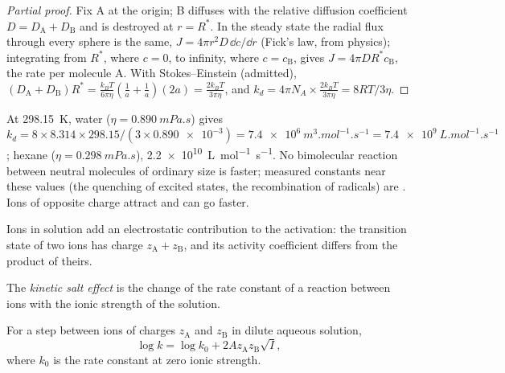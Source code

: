 \begin{proof}[Partial proof]
Fix A at the origin; B diffuses with the relative diffusion coefficient $D =
D_{\mathrm A} + D_{\mathrm B}$ and is destroyed at $r = R^*$. In the steady state the radial flux
through every sphere is the same, $J = 4\pi r^2D\,\dd c/\dd r$ (Fick's law, from
physics); integrating from $R^*$, where $c = 0$, to infinity, where $c = c_{\mathrm B}$, gives
$J = 4\pi DR^*c_{\mathrm B}$, the rate per molecule A. With Stokes--Einstein (admitted),
$(D_{\mathrm A} + D_{\mathrm B})R^* = \frac{k_BT}{6\pi\eta}(\frac{1}{a} + \frac1a)(2a) = \frac{2k_BT}{3\pi\eta}$, and $k_d = 4\pi N_A \times
\frac{2k_BT}{3\pi\eta} = 8RT/3\eta$.
\end{proof}

\begin{example}\label{ex:b3:rate-theories:speed-limit}
At \qty{298.15}{K}, water ($\eta = \qty{0.890}{mPa.s}$) gives $k_d = 8 \times 8.314 \times
298.15/(3 \times \num{0.890e-3}) = \qty{7.4e6}{m^3.mol^{-1}.s^{-1}} = \qty{7.4e9}{L.mol^{-1}.s^{-1}}$; hexane
($\eta = \qty{0.298}{mPa.s}$), \qty{2.2e10}{L.mol^{-1}.s^{-1}}. No bimolecular reaction between
neutral molecules of ordinary size is faster; measured constants near these
values (the quenching of excited states, the recombination of radicals) are
. Ions of opposite charge attract and can go faster.
\end{example}

Ions in solution add an electrostatic contribution to the activation: the
transition state of two ions has charge $z_{\mathrm A} + z_{\mathrm B}$, and its activity coefficient
differs from the product of theirs.

\begin{definition}\label{def:b3:rate-theories:salt}
The \emph{kinetic salt effect} is the change of the rate
constant of a reaction between ions with the ionic strength of the solution.
\end{definition}

\begin{proposition}\label{prop:b3:rate-theories:bronsted-bjerrum}
For a step between ions of charges $z_{\mathrm A}$ and $z_{\mathrm B}$ in dilute aqueous solution,
\[
  \log k = \log k_0 + 2Az_{\mathrm A}z_{\mathrm B}\sqrt I,
\]
where $k_0$ is the rate constant at zero ionic strength.
\end{proposition}

